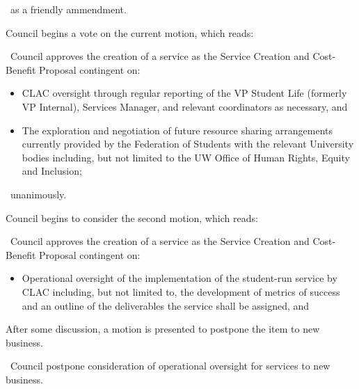 \begin{motion}
\begin{motion}
\begin{motion}
            \carries\ as a friendly ammendment.
        \end{motion}

        Council begins a vote on the current motion, which reads:
        \begin{motion}
            \birt\ Council approves the creation of a service as the Service Creation
            and Cost-Benefit Proposal contingent on:

            \begin{itemize}
                \item CLAC oversight through regular reporting of the VP Student
                    Life (formerly VP Internal), Services Manager, and relevant
                    coordinators as necessary, and 

                \item The exploration and negotiation of future resource sharing
                    arrangements currently provided by the Federation of Students with
                    the relevant University bodies including, but not limited to the UW
                    Office of Human Rights, Equity and Inclusion;

            \end{itemize}
        \end{motion}

        \carries\ unanimously.
    \end{motion}

    Council begins to consider the second motion, which reads:
    \begin{motion}
        \birt\ Council approves the creation of a service as the Service Creation
        and Cost-Benefit Proposal contingent on:
        \begin{itemize}
            \item Operational oversight of the implementation of the
                student-run service by CLAC including, but not limited to, the
                development of metrics of success and an outline of the
                deliverables the service shall be assigned, and
        \end{itemize}

        After some discussion, a motion is presented to postpone the item to
        new business.

        \begin{motion}
            \birt\ Council postpone consideration of operational oversight for
            services to new business. 
            \movers{\seneca}{\katie}


\end{motion}
\end{motion}
\end{motion}
